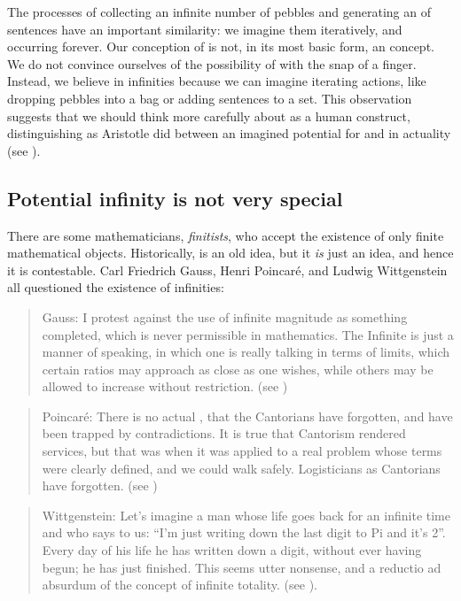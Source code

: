  The processes of collecting an infinite number of pebbles and generating an  of sentences have an important similarity: we imagine them iteratively, and occurring forever. Our conception of  is not, in its most basic form, an  concept. We do not convince ourselves of the possibility of  with the snap of a finger. Instead, we believe in infinities because we can imagine iterating actions, like dropping pebbles into a bag or adding sentences to a set. This observation suggests that we should think more carefully about  as a human construct, distinguishing as Aristotle did between an imagined potential for  and  in actuality (see \citealt{Lear1988}).

\subsection{Potential infinity is not very special}

There are some mathematicians, \textit{finitists}, who accept the existence of only finite mathematical objects. Historically,  is an old idea, but it \textit{is} just an idea, and hence it is contestable. Carl Friedrich Gauss, Henri Poincaré, and Ludwig Wittgenstein all questioned the existence of infinities: 

\begin{quote}
Gauss: I protest against the use of infinite magnitude as something completed, which is never permissible in mathematics. The Infinite is just a manner of speaking, in which one is really talking in terms of limits, which certain ratios may approach as close as one wishes, while others may be allowed to increase without restriction. (see \citealt{Waterhouse1979})
\end{quote}

\begin{quote}
Poincaré: There is no actual , that the Cantorians have forgotten, and have been trapped by contradictions. It is true that Cantorism rendered services, but that was when it was applied to a real problem whose terms were clearly defined, and we could walk safely. Logisticians as Cantorians have forgotten. (see \citealt{PoincaréMaitland2003}) 
\end{quote}

\begin{quote}
Wittgenstein: Let's imagine a man whose life goes back for an infinite time and who says to us: “I'm just writing down the last digit to Pi and it's 2”. Every day of his life he has written down a digit, without ever having begun; he has just finished. This seems utter nonsense, and a reductio ad absurdum of the concept of infinite totality. (see \citealt{Wittgenstein1980}).
\end{quote}

